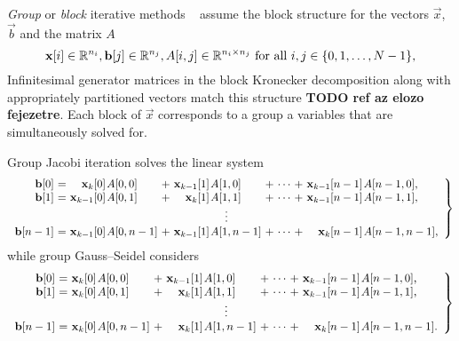 \emph{Group} or \emph{block} iterative methods%
~\citet[Section~10.4]{stewart2009probability} assume the block
structure for the vectors $\vec{x}$, $\vec{b}$ and the matrix $A$
\begin{equation}
  \bm{\mathrm{x}}[i] \in \mathbb{R}^{n_i}, \bm{\mathrm{b}}[j] \in \mathbb{R}^{n_j}, A[i, j] \in
  \mathbb{R}^{n_i \times n_j} \text{ for all $i, j \in \{0, 1, \ldots,
    N - 1\}$,}
\end{equation}
Infinitesimal generator matrices in the block Kronecker decomposition
along with appropriately partitioned vectors match this structure
\textbf{TODO ref az elozo fejezetre}. Each block of $\vec{x}$
corresponds to a group a variables that are simultaneously solved
for.

Group Jacobi iteration solves the linear system
{\small\begin{equation}
    \left.
      \begin{array}{r@{${} = {}$}*{2}{r@{\kern1pt}l@{${} + {}$}}c@{${} + {}$}r@{\kern1pt}l}
        \vec{b}[0] & \vec{x}_{k}[0] & A[0,0] & \vec{x}_{k - 1}[1] & A[1,0] & \cdots & \vec{x}_{k - 1}[n - 1] & A[n - 1,0] \text,\\
        \vec{b}[1] & \vec{x}_{k - 1}[0] & A[0,1] & \vec{x}_{k}[1] & A[1,1] & \cdots & \vec{x}_{k - 1}[n - 1] & A[n - 1,1] \text,\\
        \multicolumn{8}{c}{$\vdots$} \\
        \vec{b}[n - 1] & \vec{x}_{k - 1}[0] & A[0,n - 1] & \vec{x}_{k - 1}[1] & A[1,n - 1] & \cdots & \vec{x}_{k}[n - 1] & A[n - 1,n - 1] \text,\\
      \end{array}
    \right\}
  \end{equation}}%
while group Gauss--Seidel considers
{\small\begin{equation}
    \left.
      \begin{array}{r@{${} = {}$}*{2}{r@{\kern1pt}l@{${} + {}$}}c@{${} + {}$}r@{\kern1pt}l}
        \vec{b}[0] & \vec{x}_{k}[0] & A[0,0] & \vec{x}_{k - 1}[1] & A[1,0] & \cdots & \vec{x}_{k - 1}[n - 1] & A[n - 1,0] \text,\\
        \vec{b}[1] & \vec{x}_{k}[0] & A[0,1] & \vec{x}_{k}[1] & A[1,1] & \cdots & \vec{x}_{k - 1}[n - 1] & A[n - 1,1] \text,\\
        \multicolumn{8}{c}{$\vdots$} \\
        \vec{b}[n - 1] & \vec{x}_{k}[0] & A[0,n - 1] & \vec{x}_{k}[1] & A[1,n - 1] & \cdots & \vec{x}_{k}[n - 1] & A[n - 1,n - 1] \text.\\
      \end{array}
    \right\}
  \end{equation}}

